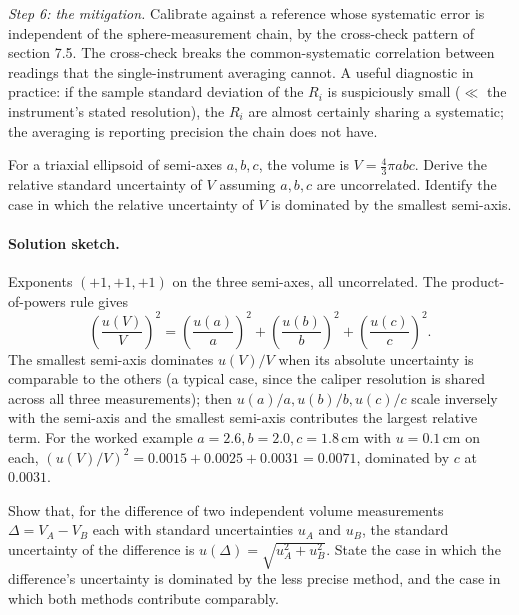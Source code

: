 \emph{Step 6: the mitigation.}
Calibrate against a reference whose systematic error is
independent of the sphere-measurement chain, by the cross-check
pattern of section 7.5. The cross-check breaks the
common-systematic correlation between readings that the
single-instrument averaging cannot. A useful diagnostic in
practice: if the sample standard deviation of the $R_{i}$ is
suspiciously small ($\ll$ the instrument's stated resolution),
the $R_{i}$ are almost certainly sharing a systematic; the
averaging is reporting precision the chain does not have.

\begin{exercise}
For a triaxial ellipsoid of semi-axes $a, b, c$, the volume is
$V = \tfrac{4}{3}\pi a b c$. Derive the relative standard uncertainty
of $V$ assuming $a, b, c$ are uncorrelated. Identify the case in
which the relative uncertainty of $V$ is dominated by the smallest
semi-axis.
\end{exercise}

\paragraph{Solution sketch.}
Exponents $(+1, +1, +1)$ on the three semi-axes, all uncorrelated.
The product-of-powers rule gives
\[
\left(\frac{u(V)}{V}\right)^{2}
  = \left(\frac{u(a)}{a}\right)^{2}
  + \left(\frac{u(b)}{b}\right)^{2}
  + \left(\frac{u(c)}{c}\right)^{2}.
\]
The smallest semi-axis dominates $u(V)/V$ when its absolute
uncertainty is comparable to the others (a typical case, since the
caliper resolution is shared across all three measurements); then
$u(a)/a, u(b)/b, u(c)/c$ scale inversely with the semi-axis and the
smallest semi-axis contributes the largest relative term. For the
worked example $a = 2.6, b = 2.0, c = 1.8 \,\si{\centi\meter}$ with
$u = 0.1 \,\si{\centi\meter}$ on each, $(u(V)/V)^{2} = 0.0015 +
0.0025 + 0.0031 = 0.0071$, dominated by $c$ at $0.0031$.

\begin{exercise}
Show that, for the difference of two independent volume
measurements $\Delta = V_{A} - V_{B}$ each with standard
uncertainties $u_{A}$ and $u_{B}$, the standard uncertainty of the
difference is $u(\Delta) = \sqrt{u_{A}^{2} + u_{B}^{2}}$. State the
case in which the difference's uncertainty is dominated by the less
precise method, and the case in which both methods contribute
comparably.
\end{exercise}

